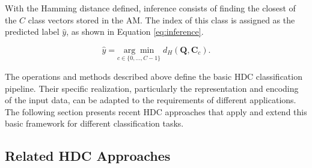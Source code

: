         With the Hamming distance defined, inference consists of finding the closest of the $C$ class vectors stored in the \ac{AM}. The index of this class is assigned as the predicted label $\hat{y}$, as shown in Equation \ref{eq:inference}.

    \begin{equation}
        \hat{y}
        =
        \underset{c \in \{0,\ldots,C-1\}}{\arg\min}
        \;
        d_H\!\left(\mathbf{Q}, \mathbf{C}_c\right).
        \label{eq:inference}
    \end{equation}

        The operations and methods described above define the basic HDC classification pipeline. Their specific realization, particularly the representation and encoding of the input data, can be adapted to the requirements of different applications. The following section presents recent HDC approaches that apply and extend this basic framework for different classification tasks.

    \subsection{Related HDC Approaches}


